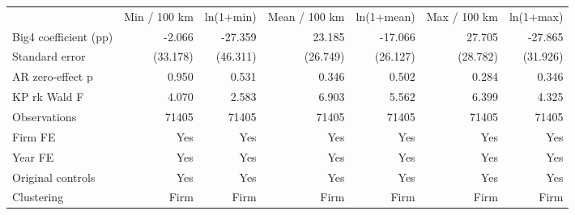 \begin{tabular}{lrrrrrr}
\hline
 & Min / 100 km & ln(1+min) & Mean / 100 km & ln(1+mean) & Max / 100 km & ln(1+max) \\
Big4 coefficient (pp) & -2.066 & -27.359 & 23.185 & -17.066 & 27.705 & -27.865 \\
Standard error & (33.178) & (46.311) & (26.749) & (26.127) & (28.782) & (31.926) \\
AR zero-effect p & 0.950 & 0.531 & 0.346 & 0.502 & 0.284 & 0.346 \\
KP rk Wald F & 4.070 & 2.583 & 6.903 & 5.562 & 6.399 & 4.325 \\
Observations & 71405 & 71405 & 71405 & 71405 & 71405 & 71405 \\
Firm FE & Yes & Yes & Yes & Yes & Yes & Yes \\
Year FE & Yes & Yes & Yes & Yes & Yes & Yes \\
Original controls & Yes & Yes & Yes & Yes & Yes & Yes \\
Clustering & Firm & Firm & Firm & Firm & Firm & Firm \\
\hline
\end{tabular}
